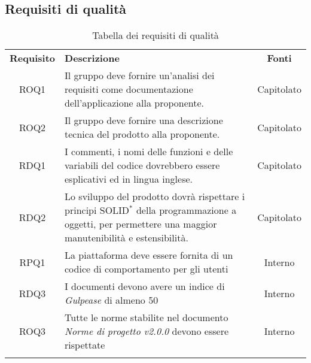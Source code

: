 \subsection{Requisiti di qualità}
\begin{longtable}{| c | p{10cm} | c |}
		\rowcolor{LightBlue}
		\color{white}\bfseries Requisito & \color{white}\bfseries Descrizione & \color{white}\bfseries Fonti\\[0.25cm]
		ROQ1 & Il gruppo deve fornire un'analisi dei requisiti come documentazione dell'applicazione alla proponente. & Capitolato \\
		ROQ2 & Il gruppo deve fornire una descrizione tecnica del prodotto alla proponente. & Capitolato \\ 
		RDQ1 & I commenti, i nomi delle funzioni e delle variabili del codice dovrebbero essere esplicativi ed in lingua inglese. & Capitolato \\ 
		RDQ2 & Lo sviluppo del prodotto dovrà rispettare i principi SOLID$^*$ della programmazione a oggetti, per permettere una maggior manutenibilità e estensibilità. & Capitolato \\
		RPQ1 & La piattaforma deve essere fornita di un codice di comportamento per gli utenti & Interno\\
		RDQ3 & I documenti devono avere un indice di \textit{Gulpease} di almeno 50 & Interno\\
		ROQ3 & Tutte le norme stabilite nel documento \textit{Norme di progetto v2.0.0} devono essere rispettate & Interno\\
		\hline
		\caption{Tabella dei requisiti di qualità}
\end{longtable}